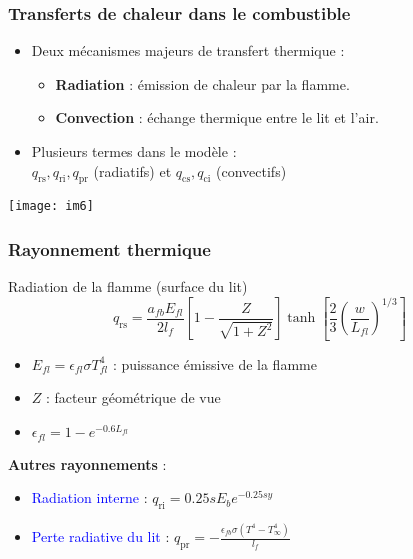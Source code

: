 \documentclass[handout]{beamer}
\newtheorem{pbm et hypo}[thm]{Problématique et hypothèses}
\begin{document}
	\begin{frame}
		\frametitle{Transferts de chaleur dans le combustible \phone}
		
		\begin{itemize}
			\item Deux mécanismes majeurs de transfert thermique :
			\begin{itemize}
				\item \textbf{Radiation} : émission de chaleur par la flamme.
				\item \textbf{Convection} : échange thermique entre le lit et l'air.
			\end{itemize}
			\item Plusieurs termes dans le modèle : \\
			$q_{\text{rs}}, q_{\text{ri}}, q_{\text{pr}}$ (radiatifs) et $q_{\text{cs}}, q_{\text{ci}}$ (convectifs)
		\end{itemize}
		
		\vspace{1ex}
		\begin{center}
			\texttt{[image: im6]}
		\end{center}
	\end{frame}
	\begin{frame}
		\frametitle{Rayonnement thermique \phone}
		
		\begin{block}{Radiation de la flamme (surface du lit)}
			\vspace{-1.5ex}
			\begin{equation}
				q_{\text{rs}} = \frac{a_{fb}E_{fl}}{2l_f}\left[1 - \frac{Z}{\sqrt{1+Z^2}}\right] \tanh\left[\frac{2}{3}\left(\frac{w}{L_{fl}}\right)^{1/3}\right]
			\end{equation}
		\end{block}
		
		\begin{itemize}
			\item $E_{fl} = \epsilon_{fl} \sigma T_{fl}^4$ : puissance émissive de la flamme
			\item $Z$ : facteur géométrique de vue
			\item $\epsilon_{fl} = 1 - e^{-0.6L_{fl}}$
		\end{itemize}
		\textbf{Autres rayonnements} :
		\begin{itemize}
			\item \textcolor{blue}{Radiation interne} : $q_{\text{ri}} = 0.25sE_b e^{-0.25sy}$
			\item \textcolor{blue}{Perte radiative du lit} : $q_{\text{pr}} = -\frac{\epsilon_{fb} \sigma (T^4 - T_\infty^4)}{l_f}$
		\end{itemize}
	\end{frame}
\end{document}
